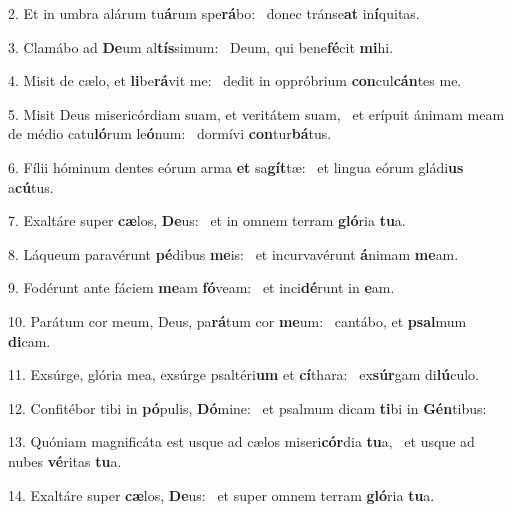 2. Et in umbra alárum tu\textbf{á}rum spe\textbf{rá}bo: \ast\  donec tránse\textbf{at} in\textbf{í}quitas.\

3. Clamábo ad \textbf{De}um al\textbf{tís}simum: \ast\  Deum, qui bene\textbf{fé}cit \textbf{mi}hi.\

4. Misit de cælo, et \textbf{li}be\textbf{rá}vit me: \ast\  dedit in oppróbrium \textbf{con}cul\textbf{cán}tes me.\

5. Misit Deus misericórdiam suam, et veritátem suam, \dag\  et erípuit ánimam meam de médio catu\textbf{ló}rum le\textbf{ó}num: \ast\  dormívi \textbf{con}tur\textbf{bá}tus.\

6. Fílii hóminum dentes eórum arma \textbf{et} sa\textbf{gít}tæ: \ast\  et lingua eórum gládi\textbf{us} a\textbf{cú}tus.\

7. Exaltáre super \textbf{cæ}los, \textbf{De}us: \ast\  et in omnem terram \textbf{gló}ria \textbf{tu}a.\

8. Láqueum paravérunt \textbf{pé}dibus \textbf{me}is: \ast\  et incurvavérunt \textbf{á}nimam \textbf{me}am.\

9. Fodérunt ante fáciem \textbf{me}am \textbf{fó}veam: \ast\  et inci\textbf{dé}runt in \textbf{e}am.\

10. Parátum cor meum, Deus, pa\textbf{rá}tum cor \textbf{me}um: \ast\  cantábo, et \textbf{psal}mum \textbf{di}cam.\

11. Exsúrge, glória mea, exsúrge psaltéri\textbf{um} et \textbf{cí}thara: \ast\  ex\textbf{súr}gam di\textbf{lú}culo.\

12. Confitébor tibi in \textbf{pó}pulis, \textbf{Dó}mine: \ast\  et psalmum dicam \textbf{ti}bi in \textbf{Gén}tibus:\

13. Quóniam magnificáta est usque ad cælos miseri\textbf{cór}dia \textbf{tu}a, \ast\  et usque ad nubes \textbf{vé}ritas \textbf{tu}a.\

14. Exaltáre super \textbf{cæ}los, \textbf{De}us: \ast\  et super omnem terram \textbf{gló}ria \textbf{tu}a.\

